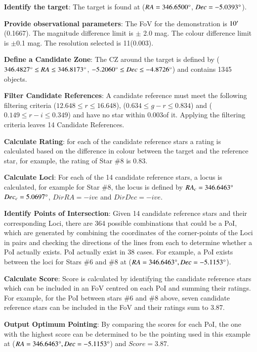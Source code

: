 \documentclass{aa}
\begin{document}
\textbf{Identify the target}: The target is found at (${RA = 346.6500\degree}$, ${Dec =-5.0393\degree}$).

\textbf{Provide observational parameters}: The FoV for the demonstration is $10^\prime$ (0.1667\textdegree). The magnitude difference limit is $\pm$ 2.0 mag. The colour difference limit is $\pm$0.1 mag. The resolution selected is 11\arcsec (0.003\textdegree).

\textbf{Define a Candidate Zone}: The CZ around the target is defined by (${346.4827\degree \leq RA \leq 346.8173\degree{}}$, ${-5.2060\degree \leq Dec \leq -4.8726\degree}$) and contains 1345 objects.

\textbf{Filter Candidate References}: A candidate reference must meet the following filtering criteria (${12.648 \leq r \leq 16.648}$), (${0.634 \leq g-r \leq 0.834}$) and (${0.149 \leq r-i \leq 0.349}$) and have no star within 0.003\textdegree of it. Applying the filtering criteria leaves 14 Candidate References.

\textbf{Calculate Rating}: for each of the candidate reference stars a rating is calculated based on the difference in colour between the target and the reference star, for example, the rating of Star \#{}8 is 0.83.

\textbf{Calculate Loci}: For each of the 14 candidate reference stars, a locus is calculated, for example for Star \#{}8, the locus is defined by ${RA_c=346.6463\degree{}}$ ${Dec_c=5.0697\degree{}}$, ${DirRA = -ive}$ and ${DirDec = -ive}$.

\textbf{Identify Points of Intersection}: Given 14 candidate reference stars and their corresponding Loci, there are 364 possible combinations that could be a PoI, which are generated by combining the coordinates of the corner-points of the Loci in pairs and checking the directions of the lines from each to determine whether a PoI actually exists.  PoI actually exist in 38 cases. For example, a PoI exists between the loci for Stars \#{}6 and \#{}8 at (${RA=346.6463\degree}, {Dec = -5.1153\degree}$).

\textbf{Calculate Score}: Score is calculated by identifying the candidate reference stars which can be included in an FoV centred on each PoI and summing their ratings. For example, for the PoI between stars \#{}6 and \#{}8 above, seven candidate reference stars can be included in the FoV and their ratings sum to 3.87.

\textbf{Output Optimum Pointing}: By comparing the scores for each PoI, the one with the highest score can be determined to be the pointing used in this example at (${RA=346.6463\degree}, {Dec = -5.1153\degree}$) and ${Score = 3.87}$.
\end{document}
